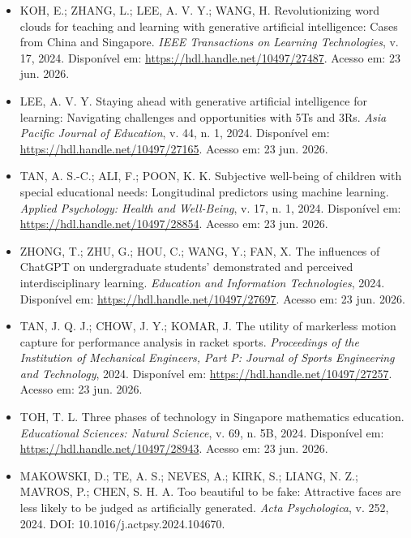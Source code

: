 \documentclass[english]{textolivre}
\begin{document}
\begin{itemize}
\item[] KOH, E.; ZHANG, L.; LEE, A. V. Y.; WANG, H. Revolutionizing word clouds for teaching and learning with generative artificial intelligence: Cases from China and Singapore. \textit{IEEE Transactions on Learning Technologies}, v. 17, 2024. Disponível em: \url{https://hdl.handle.net/10497/27487}. Acesso em: 23 jun. 2026.

\item[] LEE, A. V. Y. Staying ahead with generative artificial intelligence for learning: Navigating challenges and opportunities with 5Ts and 3Rs. \textit{Asia Pacific Journal of Education}, v. 44, n. 1, 2024. Disponível em: \url{https://hdl.handle.net/10497/27165}. Acesso em: 23 jun. 2026.

\item[] TAN, A. S.-C.; ALI, F.; POON, K. K. Subjective well-being of children with special educational needs: Longitudinal predictors using machine learning. \textit{Applied Psychology: Health and Well-Being}, v. 17, n. 1, 2024. Disponível em: \url{https://hdl.handle.net/10497/28854}. Acesso em: 23 jun. 2026.

\item[] ZHONG, T.; ZHU, G.; HOU, C.; WANG, Y.; FAN, X. The influences of ChatGPT on undergraduate students’ demonstrated and perceived interdisciplinary learning. \textit{Education and Information Technologies}, 2024. Disponível em: \url{https://hdl.handle.net/10497/27697}. Acesso em: 23 jun. 2026.

\item[] TAN, J. Q. J.; CHOW, J. Y.; KOMAR, J. The utility of markerless motion capture for performance analysis in racket sports. \textit{Proceedings of the Institution of Mechanical Engineers, Part P: Journal of Sports Engineering and Technology}, 2024. Disponível em: \url{https://hdl.handle.net/10497/27257}. Acesso em: 23 jun. 2026.

\item[] TOH, T. L. Three phases of technology in Singapore mathematics education. \textit{Educational Sciences: Natural Science}, v. 69, n. 5B, 2024. Disponível em: \url{https://hdl.handle.net/10497/28943}. Acesso em: 23 jun. 2026.

\item[] MAKOWSKI, D.; TE, A. S.; NEVES, A.; KIRK, S.; LIANG, N. Z.; MAVROS, P.; CHEN, S. H. A. Too beautiful to be fake: Attractive faces are less likely to be judged as artificially generated. \textit{Acta Psychologica}, v. 252, 2024. DOI: 10.1016/j.actpsy.2024.104670.


\end{itemize}
\end{document}
